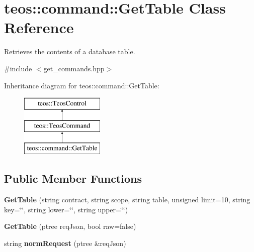 \hypertarget{classteos_1_1command_1_1_get_table}{}\section{teos\+:\+:command\+:\+:Get\+Table Class Reference}
\label{classteos_1_1command_1_1_get_table}


Retrieves the contents of a database table.  




{\ttfamily \#include $<$get\+\_\+commands.\+hpp$>$}

Inheritance diagram for teos\+:\+:command\+:\+:Get\+Table\+:\begin{figure}[H]
\begin{center}
\leavevmode
\includegraphics[height=3.000000cm]{classteos_1_1command_1_1_get_table}
\end{center}
\end{figure}
\subsection*{Public Member Functions}
\begin{DoxyCompactItemize}
\item 
\mbox{\label{classteos_1_1command_1_1_get_table_a8b928495589a3ce8b24852bb814869a6}} 
{\bfseries Get\+Table} (string contract, string scope, string table, unsigned limit=10, string key=\char`\"{}\char`\"{}, string lower=\char`\"{}\char`\"{}, string upper=\char`\"{}\char`\"{})
\item 
\mbox{\label{classteos_1_1command_1_1_get_table_a528f99f802b4406e9d87692d5d7946a5}} 
{\bfseries Get\+Table} (ptree req\+Json, bool raw=false)
\item 
\mbox{\label{classteos_1_1command_1_1_get_table_a1ef3e9835bf66ba7dcc86f4899e4dba4}} 
string {\bfseries norm\+Request} (ptree \&req\+Json)
\end{DoxyCompactItemize}

